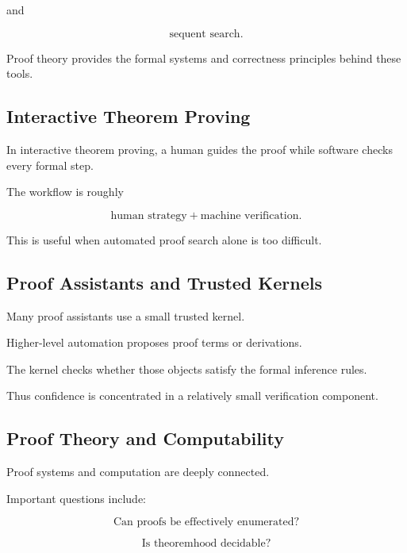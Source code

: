 and

\[
\boxed{
\text{sequent search}.
}
\]

Proof theory provides the formal systems and correctness principles behind
these tools.

\subsection{Interactive Theorem Proving}
\label{subsec:interactive-theorem-proving}

In interactive theorem proving, a human guides the proof while software
checks every formal step.

The workflow is roughly

\[
\boxed{
\text{human strategy}
+
\text{machine verification}.
}
\]

This is useful when automated proof search alone is too difficult.

\subsection{Proof Assistants and Trusted Kernels}
\label{subsec:proof-assistants-kernels}

Many proof assistants use a small trusted kernel.

Higher-level automation proposes proof terms or derivations.

The kernel checks whether those objects satisfy the formal inference rules.

Thus confidence is concentrated in a relatively small verification
component.

\subsection{Proof Theory and Computability}
\label{subsec:proof-theory-computability}

Proof systems and computation are deeply connected.

Important questions include:

\[
\boxed{
\text{Can proofs be effectively enumerated?}
}
\]

\[
\boxed{
\text{Is theoremhood decidable?}
}
\]

